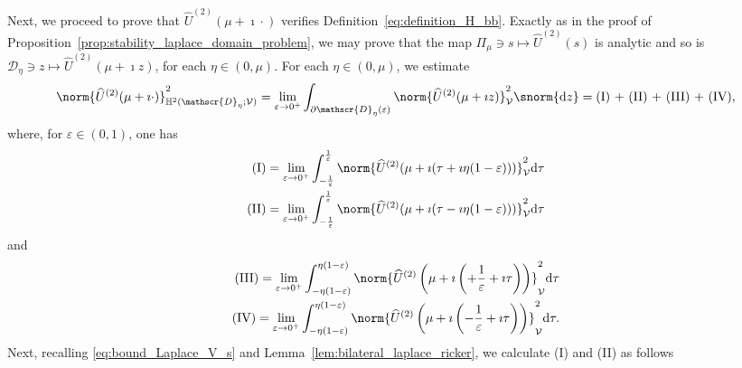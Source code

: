 Next, we proceed to prove that  $\widehat{U}^{(2)}(\mu+\imath \cdot )$
verifies Definition~\ref{eq:definition_H_bb}.
Exactly as in the proof of Proposition~\ref{prop:stability_laplace_domain_problem},
we may prove that the map $\Pi_\mu \ni s \mapsto \widehat{U}^{(2)}(s)$ is analytic and so is
$\mathscr{D}_\eta \ni z  \mapsto \widehat{U}^{(2)}(\mu+\imath z)$, for each $\eta \in (0,\mu)$.
For each $\eta \in (0,\mu)$, we estimate
\begin{equation}
	\norm{
		\widehat{U}^{(2)}(\mu + \imath \cdot)
	}^2_{\mathbb{H}^2(\mathscr{D}_\eta;\mathcal{V})}
    =
    \lim_{\varepsilon \rightarrow 0^+}
	\int_{\partial \mathscr{D}_\eta(\varepsilon) }
	\norm{\widehat{U}^{(2)}(\mu + \imath z)}^2_\mathcal{V}
	\snorm{\text{d}z}
    =
    \text{(I) + (II) + (III) + (IV)},
\end{equation}
where, for $\varepsilon \in (0,1)$, one has
\begin{equation}
\begin{aligned}
    \text{(I)}
    =
    \lim_{\varepsilon \rightarrow 0^+}
    \int_{-\frac{1}{\varepsilon}}^{\frac{1}{\varepsilon}}
    \norm{\widehat{U}^{(2)}(\mu + \imath (\tau  +\imath\eta(1-\varepsilon)))}^2_\mathcal{V}
    \text{d}\tau
    \\
    \text{(II)}
    =
    \lim_{\varepsilon \rightarrow 0^+}
    \int_{-\frac{1}{\varepsilon}}^{\frac{1}{\varepsilon}}
    \norm{\widehat{U}^{(2)}(\mu + \imath (\tau - \imath\eta(1-\varepsilon)))}^2_\mathcal{V}
    \text{d}\tau
\end{aligned}
\end{equation}
and
\begin{equation}
\begin{aligned}
    \text{(III)}
    =
    \lim_{\varepsilon \rightarrow 0^+}
    \int_{-\eta(1-\varepsilon)}^{\eta(1-\varepsilon)}
    \norm{\widehat{U}^{(2)}  
    \left(\mu+\imath\left(+\frac{1}{\varepsilon}+\imath \tau\right)\right)}^2_\mathcal{V}
    \text{d}\tau
    \\
    \text{(IV)}
    =
    \lim_{\varepsilon \rightarrow 0^+}
    \int_{-\eta(1-\varepsilon)}^{\eta(1-\varepsilon)}
    \norm{\widehat{U}^{(2)}
    \left(\mu+\imath\left(-\frac{1}{\varepsilon}+\imath\tau\right)\right)}^2_\mathcal{V}
    \text{d}\tau.
\end{aligned}
\end{equation}
Next, recalling \eqref{eq:bound_Laplace_V_s}
and Lemma~\ref{lem:bilateral_laplace_ricker}, we calculate (I) and (II) as follows
